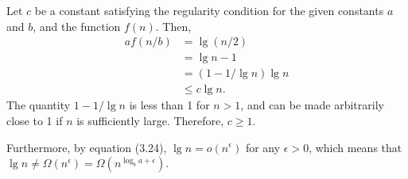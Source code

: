 Let $c$ be a constant satisfying the regularity condition for the given constants $a$ and $b$, and the function $f(n)$.
Then,
\begin{align*}
    af(n/b) &= \lg(n/2) \\
    &= \lg n-1 \\
    &= (1-1/\!\lg n)\lg n \\
    &\le c\lg n.
\end{align*}
The quantity $1-1/\!\lg n$ is less than 1 for $n>1$, and can be made arbitrarily close to 1 if $n$ is sufficiently large.
Therefore, $c\ge1$.

Furthermore, by equation (3.24), $\lg n=o(n^\epsilon)$ for any $\epsilon>0$, which means that $\lg n\ne\Omega(n^\epsilon)=\Omega(n^{\log_ba+\epsilon})$.
